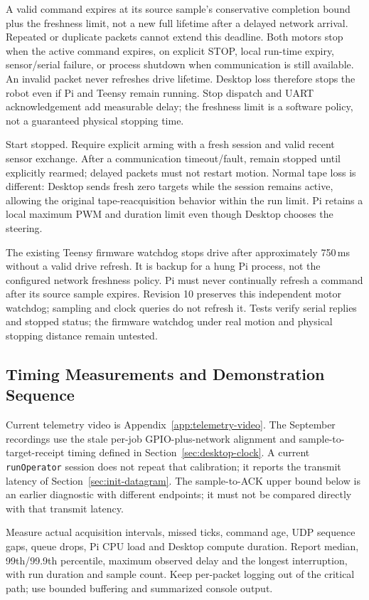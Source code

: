 A valid command expires at its source sample's conservative completion bound plus the freshness limit, not a new full lifetime after a delayed network arrival. Repeated or duplicate packets cannot extend this deadline. Both motors stop when the active command expires, on explicit STOP, local run-time expiry, sensor/serial failure, or process shutdown when communication is still available. An invalid packet never refreshes drive lifetime. Desktop loss therefore stops the robot even if Pi and Teensy remain running. Stop dispatch and UART acknowledgement add measurable delay; the freshness limit is a software policy, not a guaranteed physical stopping time.

Start stopped. Require explicit arming with a fresh session and valid recent sensor exchange. After a communication timeout/fault, remain stopped until explicitly rearmed; delayed packets must not restart motion. Normal tape loss is different: Desktop sends fresh zero targets while the session remains active, allowing the original tape-reacquisition behavior within the run limit. Pi retains a local maximum PWM and duration limit even though Desktop chooses the steering.

The existing Teensy firmware watchdog stops drive after approximately 750\,ms without a valid drive refresh. It is backup for a hung Pi process, not the configured network freshness policy. Pi must never continually refresh a command after its source sample expires. Revision 10 preserves this independent motor watchdog; sampling and clock queries do not refresh it. Tests verify serial replies and stopped status; the firmware watchdog under real motion and physical stopping distance remain untested.

\subsection{Timing Measurements and Demonstration Sequence}
Current telemetry video is Appendix~\ref{app:telemetry-video}. The September recordings use the stale per-job GPIO-plus-network alignment and sample-to-target-receipt timing defined in Section~\ref{sec:desktop-clock}. A current \texttt{runOperator} session does not repeat that calibration; it reports the transmit latency of Section~\ref{sec:init-datagram}. The sample-to-ACK upper bound below is an earlier diagnostic with different endpoints; it must not be compared directly with that transmit latency.

Measure actual acquisition intervals, missed ticks, command age, UDP sequence gaps, queue drops, Pi CPU load and Desktop compute duration. Report median, 99th/99.9th percentile, maximum observed delay and the longest interruption, with run duration and sample count. Keep per-packet logging out of the critical path; use bounded buffering and summarized console output.

